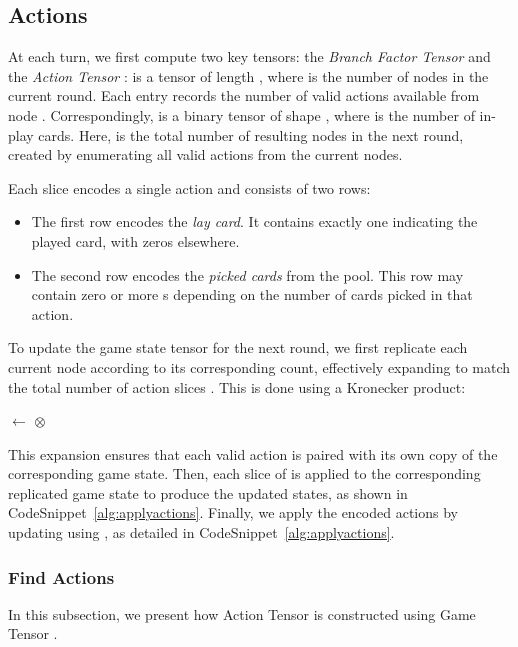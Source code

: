 \subsection{Actions}\label{sec:actions}

At each turn, we first compute two key tensors: the \emph{Branch Factor Tensor}  and the \emph{Action Tensor} :  is a tensor of length , where  is the number of nodes in the current round. Each entry  records the number of valid actions available from node . Correspondingly,  is a binary tensor of shape \py{[M',2,N]}, where  is the number of in-play cards. Here,  is the total number of resulting nodes in the next round, created by enumerating all valid actions from the current nodes.

Each slice  encodes a single action and consists of two rows:
\begin{itemize}
    \item The first row  encodes the \emph{lay card}. It contains exactly one  indicating the played card, with zeros elsewhere.
    \item The second row  encodes the \emph{picked cards} from the pool. This row may contain zero or more s depending on the number of cards picked in that action.
\end{itemize}

To update the game state tensor  for the next round, we first replicate each current node  according to its corresponding  count, effectively expanding  to match the total number of action slices .  This is done using a Kronecker product:
\begin{center}
     $\gets$  $\otimes$ 
\end{center}
This expansion ensures that each valid action is paired with its own copy of the corresponding game state. Then, each slice of  is applied to the corresponding replicated game state to produce the updated states, as shown in CodeSnippet~\ref{alg:applyactions}. Finally, we apply the encoded actions by updating  using , as detailed in CodeSnippet~\ref{alg:applyactions}. 



\subsubsection{Find Actions}
In this subsection, we present how Action Tensor  is constructed using Game Tensor .


